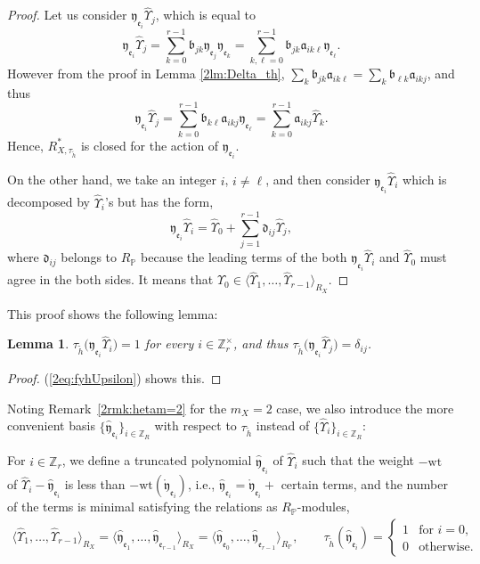 \documentclass[pdftex]{sigma}
\def\ZZ{{\mathbb Z}}
\def\PP{{\mathbb P}}
\def\fa{{\mathfrak a}}
\def\fb{{\mathfrak b}}
\def\fd{{\mathfrak d}}
\def\fe{{\mathfrak e}}
\def\fy{{\mathfrak y}}
\def\th{{\widetilde h}}
\def\hfy{{\widehat{\mathfrak y}}}
\def\hUpsilon{{\widehat \Upsilon}}
\def\rfy{{\mathring{\mathfrak y}}}
\def\wt{{\mathrm {wt}}}
\numberwithin{equation}{section}
\newtheorem{Lemma}[Theorem]{Lemma}
\begin{document}
\begin{proof}
Let us consider $\fy_{\fe_i} \hUpsilon_{j}$, which is equal to
\[
 \fy_{\fe_i} \hUpsilon_{j}
 =\sum_{k=0}^{r-1} \fb_{j k}\fy_{\fe_j}\fy_{\fe_k}
=\sum_{k,\ell=0}^{r-1} \fb_{j k}\fa_{i k\ell}\fy_{\fe_\ell}.
\]
However from the proof in Lemma \ref{2lm:Delta_th},
$\sum_k\fb_{j k}\fa_{i k\ell}=\sum_k\fb_{\ell k}\fa_{i k j}$, and thus
\[
 \fy_{\fe_i} \hUpsilon_{j}
 =\sum_{k=0}^{r-1} \fb_{k\ell}\fa_{i k j}\fy_{\fe_\ell}
=\sum_{k=0}^{r-1}\fa_{i k j}\hUpsilon_{k}.
\]
Hence, $R_{X,\tau_\th}^*$ is closed for the action of $\fy_{\fe_i}$.

On the other hand, we take an integer $i$, $i\neq \ell$, and then
consider $\fy_{\fe_i} \hUpsilon_{i}$ which is decomposed by
$\hUpsilon_{i}$'s but has the form,
\begin{equation}
 \fy_{\fe_i} \hUpsilon_{i}=\hUpsilon_0 +\sum_{j=1}^{r-1} \fd_{i j}\hUpsilon_{j},\label{2eq:fyhUpsilon}
\end{equation}
where $\fd_{i j}$ belongs to $R_\PP$ because the leading terms of the both $\fy_{\fe_i} \hUpsilon_{i}$ and $\hUpsilon_0$ must agree in the both sides.
It means that
$\hUpsilon_0 \in \big\langle \hUpsilon_{1}, \dots, \hUpsilon_{r-1}\big\rangle_{R_X}$.
\end{proof}

This proof shows the following lemma:

{\samepage
\begin{Lemma}\label{2lm:tau_th_rfe}
$\tau_\th\big(\fy_{\fe_i} \hUpsilon_{i}\big) =1$ for every $i \in \ZZ_r^\times$, and thus $\tau_\th\big(\fy_{\fe_i} \hUpsilon_{j}\big)=\delta_{i j}$.
\end{Lemma}

\begin{proof}(\ref{2eq:fyhUpsilon}) shows this.
\end{proof}}

Noting Remark~\ref{2rmk:hetam=2} for the $m_X=2$ case, we also introduce the more convenient basis $\{\hfy_{\fe_i}\}_{i \in \ZZ_R}$ with respect to $\tau_{\th}$ instead of $\{\hUpsilon_i\}_{i \in \ZZ_R}$:

\begin{Definition} \label{2df:hfy}
For $i \in \ZZ_r$, we define a truncated polynomial $\hfy_{\fe_i}$ of $\hUpsilon_{i}$ such that the weight $-\wt$ of $\hUpsilon_i -\hfy_{\fe_i}$ is less than $-\wt(\rfy_{\fe_i})$, i.e., $\hfy_{\fe_i}= \rfy_{\fe_i}+$ certain terms, and the number of the terms is minimal satisfying the relations as $R_\PP$-modules,
\begin{gather*}
\big\langle \hUpsilon_{1}, \dots, \hUpsilon_{r-1}\big\rangle_{R_X}
=\big\langle \hfy_{\fe_1}, \dots, \hfy_{\fe_{r-1}}\big\rangle_{R_X}
=\big\langle \hfy_{\fe_0}, \dots, \hfy_{\fe_{r-1}}\big\rangle_{R_\PP},
\qquad \tau_{\th}(\hfy_{\fe_i})=
\begin{cases}
1 & \text{for } i=0,\\
0 & \text{otherwise}.
\end{cases}\!
\end{gather*}
\end{Definition}
\end{document}
